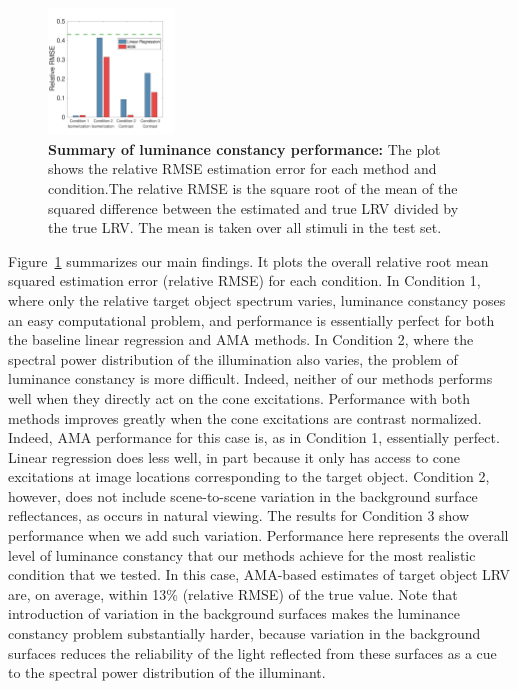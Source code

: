 \documentclass{jov}
\begin{document}
\begin{figure}
\centering
\includegraphics[width=0.3\textwidth]{../FiguresDraft4/Figure13/Figure13_a.pdf}
\caption{{\bf Summary of luminance constancy performance:} The plot shows the relative RMSE estimation error for each method and condition.The relative RMSE is the square root of the mean of the squared difference between the estimated and true LRV divided by the true LRV. The mean is taken over all stimuli in the test set.}
 \label{fig:barGraphs}
\end{figure}

Figure~\ref{fig:barGraphs} summarizes our main findings.
It plots the overall relative root mean squared estimation error (relative RMSE) for each condition. 
In Condition 1, where only the relative target object spectrum varies, luminance constancy poses an easy computational problem,
and performance is essentially perfect for both the baseline linear regression and AMA methods.
In Condition 2, where the spectral power distribution of the illumination also varies, the problem of luminance constancy is more difficult.
Indeed, neither of our methods performs well when they directly act on the cone excitations.
Performance with both methods improves greatly when the cone excitations are contrast normalized. 
Indeed, AMA performance for this case is, as in Condition 1, essentially perfect.
Linear regression does less well, in part because it only has access to cone excitations at image locations
corresponding to the target object.
Condition 2, however, does not include scene-to-scene variation in the background surface reflectances,
as occurs in natural viewing.
The results for Condition 3 show performance when we add such variation.
Performance here represents the overall level of luminance constancy that our methods achieve for the
most realistic condition that we tested.
In this case, AMA-based estimates of target object LRV are, on average, within 13\% (relative RMSE) of the true value.
Note that introduction of variation in the background surfaces makes the luminance constancy problem substantially harder,
because variation in the background surfaces reduces the reliability of the light reflected from these
surfaces as a cue to the spectral power distribution of the illuminant.
\end{document}
